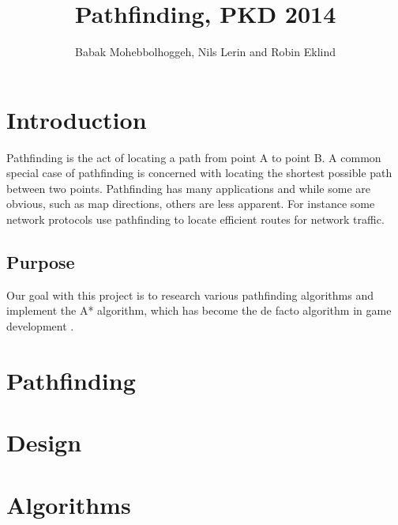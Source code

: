 \documentclass[12pt, a4paper]{article}
\title{Pathfinding, PKD 2014}
\author{Babak Mohebbolhoggeh, Nils Lerin and Robin Eklind}
\begin{document}
\maketitle

\pagebreak

\tableofcontents

\pagebreak


\section{Introduction}

Pathfinding is the act of locating a path from point A to point B. A common
special case of pathfinding is concerned with locating the shortest possible
path between two points. Pathfinding has many applications and while some are
obvious, such as map directions, others are less apparent. For instance some
network protocols use pathfinding to locate efficient routes for network
traffic.


\subsection{Purpose}

Our goal with this project is to research various pathfinding algorithms and
implement the A* algorithm, which has become the de facto algorithm in game
development \cite{astar1, defacto}.


\section{Pathfinding}


\section{Design}


\section{Algorithms}
\end{document}
